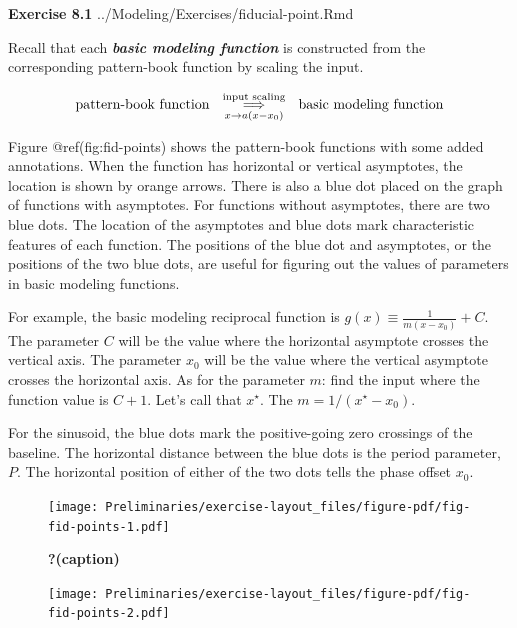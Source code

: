 \documentclass[
  letterpaper,
  DIV=11,
  numbers=noendperiod,
  oneside]{article}
\begin{document}
\begin{multicols}{2}
\textbf{Exercise 8.1} ../Modeling/Exercises/fiducial-point.Rmd

Recall that each \textbf{\emph{basic modeling function}} is constructed
from the corresponding pattern-book function by scaling the input.

\[\text{pattern-book function}\ \ \underset{x\rightarrow a(x-x_0)}{\overset{\text{input scaling}}{\Large\Longrightarrow}} \ \ \text{basic modeling function}\]

Figure @ref(fig:fid-points) shows the pattern-book functions with some
added annotations. When the function has horizontal or vertical
asymptotes, the location is shown by orange arrows. There is also a blue
dot placed on the graph of functions with asymptotes. For functions
without asymptotes, there are two blue dots. The location of the
asymptotes and blue dots mark characteristic features of each function.
The positions of the blue dot and asymptotes, or the positions of the
two blue dots, are useful for figuring out the values of parameters in
basic modeling functions.

For example, the basic modeling reciprocal function is
\(g(x) \equiv \frac{1}{m (x-x_0)} + C\). The parameter \(C\) will be the
value where the horizontal asymptote crosses the vertical axis. The
parameter \(x_0\) will be the value where the vertical asymptote crosses
the horizontal axis. As for the parameter \(m\): find the input where
the function value is \(C+1\). Let's call that \(x^\star\). The
\(m = 1/(x^\star - x_0)\).

For the sinusoid, the blue dots mark the positive-going zero crossings
of the baseline. The horizontal distance between the blue dots is the
period parameter, \(P\). The horizontal position of either of the two
dots tells the phase offset \(x_0\).

\begin{figure}

{\centering \texttt{[image: Preliminaries/exercise-layout\_files/figure-pdf/fig-fid-points-1.pdf]}

}

\caption{\label{fig-fid-points-1}\textbf{?(caption)}}

\end{figure}

\begin{figure}

{\centering \texttt{[image: Preliminaries/exercise-layout\_files/figure-pdf/fig-fid-points-2.pdf]}

}


\end{figure}
\end{multicols}
\end{document}
